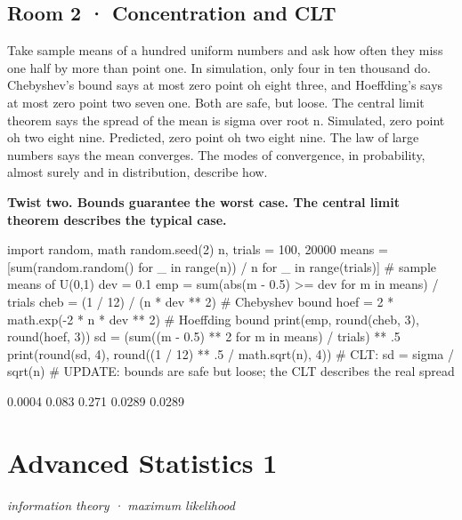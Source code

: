 \documentclass[11pt,a4paper]{report}
\begin{document}
\section*{Room 2 · Concentration and CLT}
Take sample means of a hundred uniform numbers and ask how often they miss one half by more than point one. In simulation, only four in ten thousand do. Chebyshev's bound says at most zero point oh eight three, and Hoeffding's says at most zero point two seven one. Both are safe, but loose. The central limit theorem says the spread of the mean is sigma over root n. Simulated, zero point oh two eight nine. Predicted, zero point oh two eight nine. The law of large numbers says the mean converges. The modes of convergence, in probability, almost surely and in distribution, describe how.
\begin{tcolorbox}[colback=yellow!12,colframe=orange!70!black,boxrule=0.4pt,left=4pt,right=4pt,top=2pt,bottom=2pt]\textbf{Twist two. Bounds guarantee the worst case. The central limit theorem describes the typical case.}\end{tcolorbox}
\begin{Code}
import random, math
random.seed(2)
n, trials = 100, 20000
means = [sum(random.random() for _ in range(n)) / n for _ in range(trials)]   # sample means of U(0,1)
dev = 0.1
emp = sum(abs(m - 0.5) >= dev for m in means) / trials
cheb = (1 / 12) / (n * dev ** 2)            # Chebyshev bound
hoef = 2 * math.exp(-2 * n * dev ** 2)      # Hoeffding bound
print(emp, round(cheb, 3), round(hoef, 3))
sd = (sum((m - 0.5) ** 2 for m in means) / trials) ** .5
print(round(sd, 4), round((1 / 12) ** .5 / math.sqrt(n), 4))    # CLT: sd = sigma / sqrt(n)
# UPDATE: bounds are safe but loose; the CLT describes the real spread
\end{Code}
\begin{Out}
0.0004 0.083 0.271
0.0289 0.0289
\end{Out}
\chapter{Advanced Statistics 1}
\textit{information theory · maximum likelihood}
\end{document}
